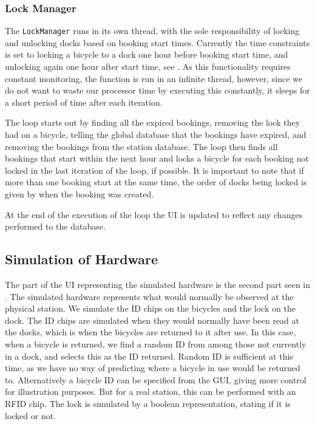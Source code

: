 \subsubsection{Lock Manager}
The \texttt{LockManager} runs in its own thread, with the sole responsibility of locking and unlocking docks based on booking start times. 
Currently the time constraints is set to locking a bicycle to a dock one hour before booking start time, and unlocking again one hour after start time, see . 
As this functionality requires constant monitoring, the function is run in an infinite thread, however, since we do not want to waste our processor time by executing this constantly, it sleeps for a short period of time after each iteration.

The loop starts out by finding all the expired bookings, removing the lock they had on a bicycle, telling the global database that the bookings have expired, and removing the bookings from the station database.
The loop then finds all bookings that start within the next hour and locks a bicycle for each booking not locked in the last iteration of the loop, if possible. 
It is important to note that if more than one booking start at the same time, the order of docks being locked is given by when the booking was created. 

At the end of the execution of the loop the UI is updated to reflect any changes performed to the database.

\subsection{Simulation of Hardware}
The part of the UI representing the simulated hardware is the second part seen in .
The simulated hardware represents what would normally be observed at the physical station.
We simulate the ID chips on the bicycles and the lock on the dock.
The ID chips are simulated when they would normally have been read at the docks, which is when the bicycles are returned to it after use.
In this case, when a bicycle is returned, we find a random ID from among those not currently in a dock, and selects this as the ID returned.
Random ID is sufficient at this time, as we have no way of predicting where a bicycle in use would be returned to.
Alternatively a bicycle ID can be specified from the GUI, giving more control for illustration purposes.
But for a real station, this can be performed with an RFID chip.
The lock is simulated by a boolean representation, stating if it is locked or not.

